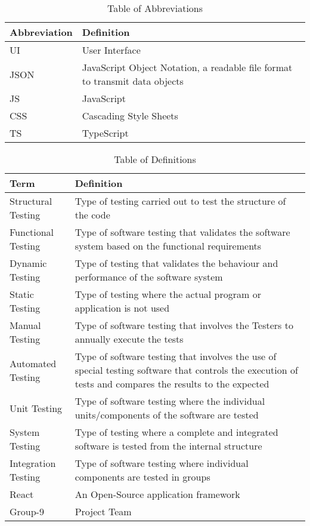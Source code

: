 \documentclass[12pt, titlepage]{article}
\begin{document}
\begin{table}[H]
\caption{Table of Abbreviations}
\begin{center}
\begin{tabular}{ |m{10em}|m{20em}|} 
 \hline
 Abbreviation & Definition \\ 
 \hline
 UI & User Interface \\
 \hline
 JSON & JavaScript Object Notation, a readable file format to transmit data objects\\ 
 \hline
 JS & JavaScript\\
 \hline 
 CSS & Cascading Style Sheets\\
 \hline
 TS & TypeScript\\
 \hline
\end{tabular}
\end{center}
\label{abbrev}
\end{table}

\begin{table}[H]
\caption{Table of Definitions}
\begin{center}
\begin{tabular}{ |m{10em}|m{20em}|} 
 \hline
 Term & Definition \\ 
 \hline
 Structural Testing & Type of testing carried out to test the structure of the code \\
 \hline
 Functional Testing & Type of software testing that validates the software system based on the functional requirements\\ 
 \hline
 Dynamic Testing & Type of testing that validates the behaviour and performance of the software system\\
 \hline 
 Static Testing & Type of testing where the actual program or application is not used\\
 \hline
 Manual Testing & Type of software testing that involves the Testers to annually execute the tests\\
 \hline
 Automated Testing & Type of software testing that involves the use of special testing software that controls the execution of tests and compares the results to the expected\\
 \hline
 Unit Testing & Type of software testing where the individual units/components of the software are tested\\
 \hline
 System Testing & Type of testing where a complete and integrated software is tested from the internal structure\\
 \hline
 Integration Testing & Type of software testing where individual components are tested in groups\\
 \hline
 React & An Open-Source application framework\\
 \hline
 Group-9 & Project Team\\
 \hline
\end{tabular}
\end{center}
\label{defs}
\end{table}
\end{document}
